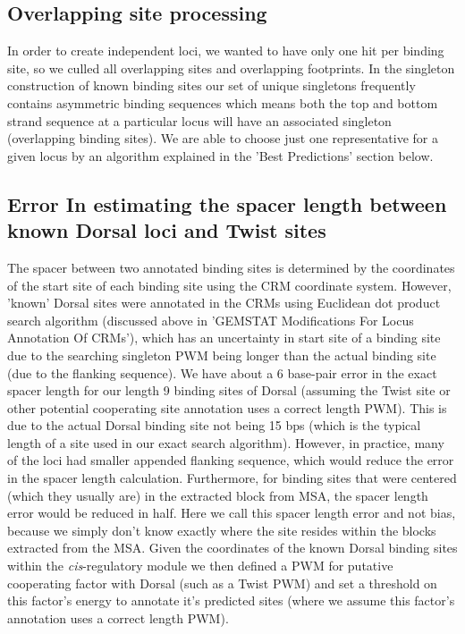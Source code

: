 	   \subsection{Overlapping site processing}\label{overlap}
  In order to create independent loci, we wanted to have only one hit per binding site, so we culled all overlapping sites and overlapping footprints.  In the singleton construction of known binding sites our set of unique singletons frequently contains asymmetric binding sequences which means both the top and bottom strand sequence at a particular locus will have an associated singleton (overlapping binding sites).  We are able to choose just one representative for a given locus by an algorithm explained in the 'Best Predictions' section below.     
 
	   \subsection{Error In estimating the spacer length between known Dorsal loci and Twist sites}
	The spacer between two annotated binding sites is determined by the coordinates of the start site of each binding site using the CRM coordinate system.  However, 'known' Dorsal sites were annotated in the CRMs using Euclidean dot product search algorithm (discussed above in 'GEMSTAT Modifications For Locus Annotation Of CRMs'), which has an uncertainty in start site of a binding site due to the searching singleton PWM being longer than the actual binding site (due to the flanking sequence).  
	We have about a 6 base-pair error in the exact spacer length for our length 9 binding sites of Dorsal (assuming the Twist site or other potential cooperating site annotation uses a correct length PWM).  This is due to the actual Dorsal binding site not being 15 bps (which is the typical length of a site used in our exact search algorithm).  However, in practice, many of the loci had smaller appended flanking sequence, which would reduce the error in the spacer length calculation.  Furthermore, for binding sites that were centered (which they usually are) in the extracted block from MSA, the spacer length error would be reduced in half.  Here we call this spacer length error and not bias, because we simply don't know exactly where the site resides within the blocks extracted from the MSA.  
	Given the coordinates of the known Dorsal binding sites within the \textit{cis}-regulatory module we then defined a PWM for putative cooperating factor with Dorsal (such as a Twist PWM) and set a threshold on this factor's energy to annotate it's predicted sites (where we assume this factor's annotation uses a correct length PWM).
	
